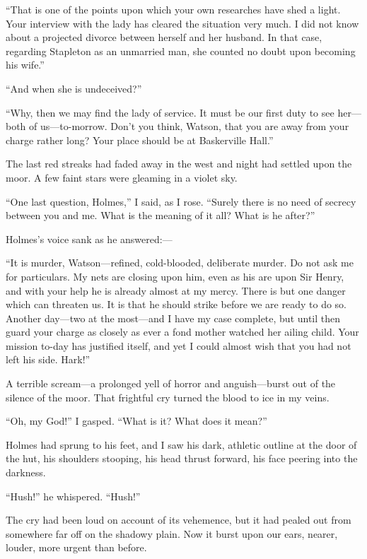 \documentclass[paper=a5,BCOR=7mm,twoside,DIV=calc,12pt,usegeometry,openany,chapterprefix,endperiod,headings=big]{scrbook} %
\begin{document}
\enquote{That is one of the points upon which your own researches have shed a light. Your interview with the lady has cleared the situation very much. I did not know about a projected divorce between herself and her husband. In that case, regarding Stapleton as an unmarried man, she counted no doubt upon becoming his wife.}

\enquote{And when she is undeceived?}

\enquote{Why, then we may find the lady of service. It must be our first duty to see her---both of us---to-morrow. Don't you think, Watson, that you are away from your charge rather long? Your place should be at Baskerville Hall.}

The last red streaks had faded away in the west and night had settled upon the moor. A few faint stars were gleaming in a violet sky.

\enquote{One last question, Holmes,} I said, as I rose. \enquote{Surely there is no need of secrecy between you and me. What is the meaning of it all? What is he after?}

Holmes's voice sank as he answered:--- 

\enquote{It is murder, Watson---refined, cold-blooded, deliberate mur\-der. Do not ask me for particulars. My nets are closing upon him, even as his are upon Sir Henry, and with your help he is already almost at my mercy. There is but one danger which can threaten us. It is that he should strike before we are ready to do so. Another day---two at the most---and I have my case complete, but until then guard your charge as closely as ever a fond mother watched her ailing child. Your mission to-day has justified itself, and yet I could almost wish that you had not left his side. Hark!}

A terrible scream---a prolonged yell of horror and anguish---burst out of the silence of the moor. That frightful cry turned the blood to ice in my veins.

\enquote{Oh, my God!} I gasped. \enquote{What is it? What does it mean?}

Holmes had sprung to his feet, and I saw his dark, athletic outline at the door of the hut, his shoulders stooping, his head thrust forward, his face peering into the darkness.

\enquote{Hush!} he whispered. \enquote{Hush!}

The cry had been loud on account of its vehemence, but it had pealed out from somewhere far off on the shadowy plain. Now it burst upon our ears, nearer, louder, more urgent than before.
\end{document}
